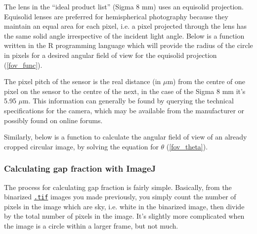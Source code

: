 \documentclass[11pt,a4paper]{article}
\newcommand\file[1]{\texttt{\underline{#1}}}  %
\begin{document}
The lens in the ``ideal product list'' (Sigma 8 mm) uses an equisolid projection. Equisolid lenses are preferred for hemispherical photography because they maintain an equal area for each pixel, i.e. a pixel projected through the lens has the same solid angle irrespective of the incident light angle. Below is a function written in the R programming language which will provide the radius of the circle in pixels for a desired angular field of view for the equisolid projection (\autoref{fov_func}).

\begin{minipage}{\linewidth}

\end{minipage}

The pixel pitch of the sensor is the real distance (in $\mu$m) from the centre of one pixel on the sensor to the centre of the next, in the case of the Sigma 8 mm it's 5.95 $\mu$m. This information can generally be found by querying the technical specifications for the camera, which may be available from the manufacturer or possibly found on online forums.

Similarly, below is a function to calculate the angular field of view of an already cropped circular image, by solving the equation for $\theta$ (\autoref{fov_theta}). 

\begin{minipage}{\linewidth}

\end{minipage}

\subsubsection{Calculating gap fraction with ImageJ} \label{gapfrac}

The process for calculating gap fraction is fairly simple. Basically, from the binarized \file{.tif} images you made previously, you simply count the number of pixels in the image which are sky, i.e. white in the binarized image, then divide by the total number of pixels in the image. It's slightly more complicated when the image is a circle within a larger frame, but not much.
\end{document}
